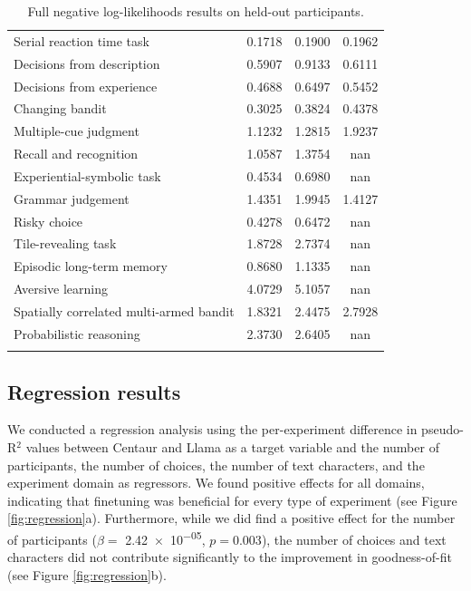 \documentclass[pdflatex,sn-nature]{sn-jnl}%
\theoremstyle{thmstyleone}%
\theoremstyle{thmstyletwo}%
\theoremstyle{thmstylethree}%
\begin{document}
\begin{table}[h]
\begin{tabular}{@{}lccc@{}}
Serial reaction time task & 0.1718 & 0.1900 & 0.1962 \\ 
Decisions from description & 0.5907 & 0.9133 & 0.6111 \\ 
Decisions from experience & 0.4688 & 0.6497 & 0.5452 \\ 
Changing bandit & 0.3025 & 0.3824 & 0.4378 \\ 
Multiple-cue judgment & 1.1232 & 1.2815 & 1.9237 \\ 
Recall and recognition & 1.0587 & 1.3754 & nan \\ 
Experiential-symbolic task & 0.4534 & 0.6980 & nan \\ 
Grammar judgement & 1.4351 & 1.9945 & 1.4127 \\ 
Risky choice & 0.4278 & 0.6472 & nan \\ 
Tile-revealing task & 1.8728 & 2.7374 & nan \\ 
Episodic long-term memory & 0.8680 & 1.1335 & nan \\ 
Aversive learning & 4.0729 & 5.1057 & nan \\ 
Spatially correlated multi-armed bandit & 1.8321 & 2.4475 & 2.7928 \\ 
Probabilistic reasoning & 2.3730 & 2.6405 & nan \\ 
\bottomrule \\ 
\end{tabular} 
\caption{Full negative log-likelihoods results on held-out participants.}
\label{tab:tab2} 
\end{table}

\subsection*{Regression results}

We conducted a regression analysis using the per-experiment difference in pseudo-R$^2$ values between Centaur and Llama as a target variable and the number of participants, the number of choices, the number of text characters, and the experiment domain as regressors. We found positive effects for all domains, indicating that finetuning was beneficial for every type of experiment (see Figure \ref{fig:regression}a). Furthermore, while we did find a positive effect for the number of participants ($\beta =$ \num{2.42e-05}, $p = 0.003$), the number of choices and text characters did not contribute significantly to the improvement in goodness-of-fit (see Figure \ref{fig:regression}b).
\end{document}
